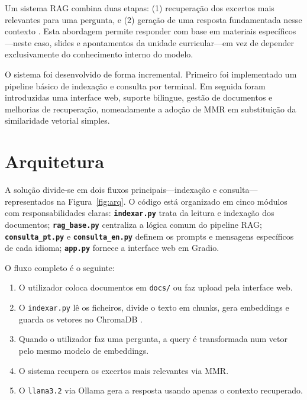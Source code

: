 \documentclass[]{ceurart}
\begin{document}
Um sistema RAG combina duas etapas: (1) recuperação dos excertos mais relevantes
para uma pergunta, e (2) geração de uma resposta fundamentada nesse contexto
\cite{lewis2020rag}.
Esta abordagem permite responder com base em materiais específicos---neste caso,
slides e apontamentos da unidade curricular---em vez de depender exclusivamente
do conhecimento interno do modelo.

O sistema foi desenvolvido de forma incremental. Primeiro foi implementado um
pipeline básico de indexação e consulta por terminal. Em seguida foram
introduzidas uma interface web, suporte bilingue, gestão de documentos e
melhorias de recuperação, nomeadamente a adoção de MMR em substituição da
similaridade vetorial simples.

\section{Arquitetura}

A solução divide-se em dois fluxos principais---indexação e consulta---
representados na Figura~\ref{fig:arq}. O código está organizado em cinco
módulos com responsabilidades claras: \textbf{\texttt{indexar.py}} trata da leitura e
indexação dos documentos; \textbf{\texttt{rag\_base.py}} centraliza a lógica comum do
pipeline RAG; \textbf{\texttt{consulta\_pt.py}} e \textbf{\texttt{consulta\_en.py}} definem os
prompts e mensagens específicos de cada idioma; \textbf{\texttt{app.py}} fornece a
interface web em Gradio.

\noindent O fluxo completo é o seguinte:

\begin{enumerate}
  \item O utilizador coloca documentos em \texttt{docs/} ou faz upload pela
        interface web.
  \item O \texttt{indexar.py} lê os ficheiros, divide o texto em chunks, gera
        embeddings e guarda os vetores no ChromaDB \cite{chromadb}.
  \item Quando o utilizador faz uma pergunta, a query é transformada num vetor
        pelo mesmo modelo de embeddings.
  \item O sistema recupera os excertos mais relevantes via MMR.
  \item O \texttt{llama3.2} via Ollama gera a resposta usando apenas o contexto
        recuperado.
\end{enumerate}
\end{document}

